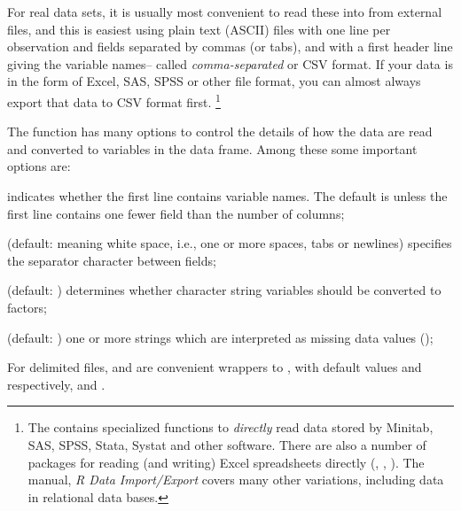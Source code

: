 \documentclass[11pt]{book}
\begin{document}
For real data sets, it is usually most convenient to read these into \R
from external files, and this is easiest using plain text (ASCII) files
with one line per observation and fields separated by commas (or tabs),
and with a first header line giving the variable names-- called
\emph{comma-separated} or CSV format.
If your data is in the form of Excel, SAS, SPSS or other file format,
you can almost always export that data to CSV format first.%
\footnote{
The  contains specialized functions to \emph{directly} read
data stored by Minitab, SAS, SPSS, Stata, Systat and other software.
There are also a number of packages for reading (and writing)
Excel spreadsheets directly (, , ).
The \R manual, \emph{R Data Import/Export} covers many other variations,
including data in relational data bases.
}

The function  has many options to control the details
of how the data are read and converted to variables in the data frame.
Among these some important options are:
\begin{description*}
  \item [\code{header}] indicates whether the first line contains
variable names. The default is  unless the first line contains one fewer field
than the number of columns;
  \item[\code{sep}] (default:  meaning white space, i.e., one or more spaces, tabs or newlines) specifies the separator character between fields;
  \item[\code{stringsAsFactors}] (default: ) determines whether character string variables should be converted to factors;
  \item[\code{na.strings}] (default: ) one or more strings which are interpreted
  as missing data values ();
\end{description*}
For delimited files,  and  are convenient wrappers
to , with default values  and 
respectively, and
. 
\end{document}
